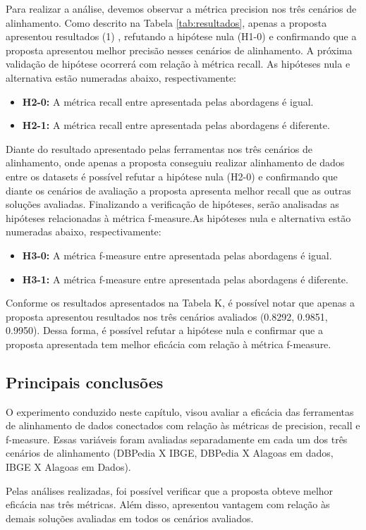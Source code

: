 Para realizar a análise, devemos observar a métrica precision nos três cenários de alinhamento. Como descrito na Tabela \ref{tab:resultados}, apenas a proposta apresentou resultados (1) , refutando a hipótese nula (H1-0) e confirmando que a proposta apresentou melhor precisão nesses cenários de alinhamento.
A próxima validação de hipótese ocorrerá com relação à métrica recall. As hipóteses nula e alternativa estão numeradas abaixo, respectivamente:

\begin{itemize}
\item \textbf{H2-0:} A métrica recall entre apresentada pelas abordagens é igual.
\item \textbf{H2-1:} A métrica recall entre apresentada pelas abordagens é diferente.
\end{itemize}

Diante do resultado apresentado pelas ferramentas nos três cenários de alinhamento, onde apenas a proposta conseguiu realizar alinhamento de dados entre os datasets é possível refutar a hipótese nula (H2-0) e confirmando que diante os cenários de avaliação a proposta apresenta melhor recall que as outras soluções avaliadas.
Finalizando a verificação de hipóteses, serão analisadas as hipóteses relacionadas à métrica f-measure.As hipóteses nula e alternativa estão numeradas abaixo, respectivamente:

\begin{itemize}
\item \textbf{H3-0:} A métrica f-measure entre apresentada pelas abordagens é igual.
\item \textbf{H3-1:} A métrica f-measure entre apresentada pelas abordagens é diferente.
\end{itemize}

Conforme os resultados apresentados na Tabela K, é possível notar que apenas a proposta apresentou resultados nos três cenários avaliados (0.8292, 0.9851, 0.9950). Dessa forma, é possível refutar a hipótese nula e confirmar que a proposta apresentada tem melhor eficácia com relação à métrica f-measure. 


\subsection*{Principais conclusões}
O experimento conduzido neste capítulo, visou avaliar a eficácia das ferramentas de alinhamento de dados conectados com relação às métricas de precision, recall e f-measure. Essas variáveis foram avaliadas separadamente em cada um dos três cenários de alinhamento (DBPedia X IBGE, DBPedia X Alagoas em dados, IBGE X Alagoas em Dados).

Pelas análises realizadas, foi possível verificar que a proposta obteve melhor eficácia nas três métricas. Além disso, apresentou vantagem com relação às demais soluções avaliadas em todos os cenários avaliados.